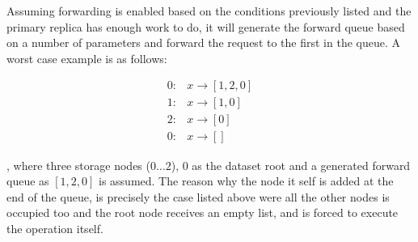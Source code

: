 Assuming forwarding is enabled based on the conditions previously listed and the primary replica has enough work to do, it will generate the forward queue based on a number of parameters and forward the request to the first in the queue. A worst case example is as follows:
\vspace*{-5mm}
\begin{center}
\begin{align*}
	0: &x \rightarrow [1, 2, 0] \\
	1: &x \rightarrow [1, 0] \\
	2: &x \rightarrow [0] \\
	0: &x \rightarrow []
\end{align*}
\end{center}
, where three storage nodes ($0 \ldots 2$), $0$ as the dataset root and a generated forward queue as $[1, 2, 0]$ is assumed. The reason why the node it self is added at the end of the queue, is precisely the case listed above were all the other nodes is occupied too and the root node receives an empty list, and is forced to execute the operation itself.
